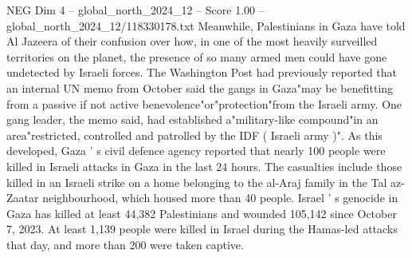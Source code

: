 \begin{textsample}{NEG Dim 4 – global\_north\_2024\_12 – Score 1.00 – global\_north\_2024\_12/118330178.txt}
Meanwhile, Palestinians in Gaza have told Al Jazeera of their confusion over how, in one of the most heavily surveilled territories on the planet, the presence of so many armed men could have gone undetected by Israeli forces.
The Washington Post had previously reported that an internal UN memo from October said the gangs in Gaza"may be benefitting from a passive if not active benevolence"or"protection"from the Israeli army.
One gang leader, the memo said, had established a"military-like compound"in an area"restricted, controlled and patrolled by the IDF ( Israeli army )".
As this developed, Gaza ' s civil defence agency reported that nearly 100 people were killed in Israeli attacks in Gaza in the last 24 hours.
The casualties include those killed in an Israeli strike on a home belonging to the al-Araj family in the Tal az-Zaatar neighbourhood, which housed more than 40 people.
Israel ' s genocide in Gaza has killed at least 44,382 Palestinians and wounded 105,142 since October 7, 2023.
At least 1,139 people were killed in Israel during the Hamas-led attacks that day, and more than 200 were taken captive.

\end{textsample}
